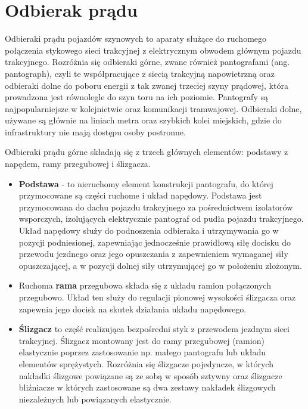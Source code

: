 \section{Odbierak prądu}
Odbieraki prądu pojazdów szynowych to aparaty służące do ruchomego połączenia stykowego sieci trakcyjnej z elektrycznym obwodem głównym pojazdu trakcyjnego. Rozróżnia się odbieraki górne, zwane również pantografami (ang. pantograph), czyli te współpracujące z siecią trakcyjną napowietrzną oraz odbieraki dolne do poboru energii z tak zwanej trzeciej szyny prądowej, która prowadzona jest równolegle do szyn toru na ich poziomie. 
Pantografy są najpopularniejsze w kolejnictwie oraz komunikacji tramwajowej. Odbieraki dolne, używane są głównie na liniach metra oraz szybkich kolei miejskich, gdzie do infrastruktury nie mają dostępu osoby postronne. 


Odbieraki prądu górne składają się z trzech głównych elementów: podstawy z napędem, ramy przegubowej i ślizgacza. 
\begin{itemize}
	\item \textbf{Podstawa} - to nieruchomy element konstrukcji pantografu, do której przymocowane są części ruchome i układ napędowy. Podstawa jest przymocowana do dachu pojazdu trakcyjnego za pośrednictwem izolatorów wsporczych, izolujących elektrycznie pantograf od pudła pojazdu trakcyjnego. Układ napędowy służy do podnoszenia odbieraka i utrzymywania go w pozycji podniesionej, zapewniając jednocześnie prawidłową siłę docisku do przewodu jezdnego oraz jego opuszczania z zapewnieniem wymaganej siły opuszczającej, a w pozycji dolnej siły utrzymującej go w położeniu złożonym. 

	\item Ruchoma \textbf{rama} przegubowa składa się z układu ramion połączonych przegubowo. Układ ten służy do regulacji pionowej wysokości ślizgacza oraz zapewnia jego docisk na skutek działania układu napędowego. 
	
	
	\item \textbf{Ślizgacz} to część realizująca bezpośredni styk z przewodem jezdnym sieci trakcyjnej. Ślizgacz montowany jest do ramy przegubowej (ramion) elastycznie poprzez zastosowanie np. małego pantografu lub układu elementów sprężystych. Rozróżnia się ślizgacze pojedyncze, w których nakładki ślizgowe powiązane są ze sobą w sposób sztywny oraz ślizgacze bliźniacze w których zastosowane są dwa zestawy nakładek ślizgowych niezależnych lub powiązanych elastycznie.
\end{itemize}

